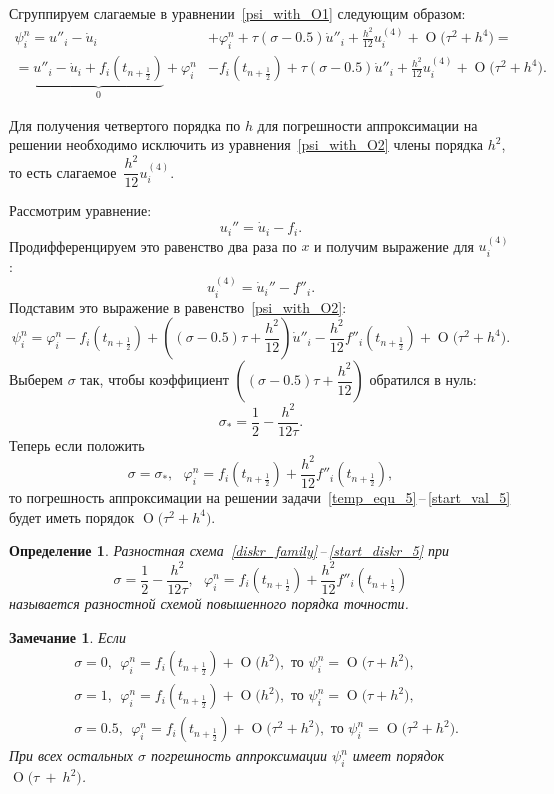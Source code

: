 \documentclass[11pt,a4paper,twoside]{report}
\numberwithin{equation}{section}
\newtheorem*{definition}{Определение}
\theoremstyle{definition}
\theoremstyle{plain}
\newtheorem*{note*}{Замечание}
\newcommand{\bigO}[1]{\ensuremath{\operatorname{O}\bigl(#1\bigr)}}
\begin{document}
Сгруппируем слагаемые в уравнении~\eqref{psi_with_O1} следующим образом:
%
\begin{equation}
%
    \label{psi_with_O2}
    \begin{split}
        \psi_i^n = u''_i - \dot{u}_i &+ \varphi_i^n + \tau(\sigma - 0.5)\dot{u}''_i
        +\frac{h^2}{12}u^{(4)}_i + \bigO{\tau^2 + h^4} = \\
        = \underbrace{u''_i - \dot{u}_i + f_i(t_{n+\frac12})}_0 + \varphi_i^n &-
        f_i(t_{n+\frac12}) + \tau(\sigma - 0.5)\dot{u}''_i +
        \frac{h^2}{12}u^{(4)}_i + \bigO{\tau^2 + h^4}.
    \end{split}
%
\end{equation}
%

Для получения четвертого порядка по $h$ для погрешности аппроксимации
на решении необходимо
исключить из уравнения~\eqref{psi_with_O2} члены порядка $h^2$, то есть
слагаемое~$\dfrac{h^2}{12}u_i^{(4)}$.

\noindent
Рассмотрим уравнение:
%
$$
    u_i'' = \dot{u}_i - f_i.
$$
%
Продифференцируем это равенство два раза по $x$ и получим выражение для $u_i^{(4)}$:
%
$$
    u_i^{(4)} = \dot{u}_i'' - f''_i.
$$
%
Подставим это выражение в равенство~\eqref{psi_with_O2}:
%
\begin{equation*}
%
    \psi_i^n = \varphi_i^n - f_i(t_{n+\frac12}) +
    \left((\sigma - 0.5)\tau + \frac{h^2}{12}\right) \dot{u}''_i -
    \frac{h^2}{12} f''_i(t_{n+\frac12}) + \bigO{\tau^2 + h^4}.
%
\end{equation*}
%
Выберем $\sigma$ так, чтобы коэффициент $\left((\sigma - 0.5)\tau + \dfrac{h^2}{12}\right)$
обратился в нуль:
%
$$
    \sigma_* = \dfrac12 - \dfrac{h^2}{12\tau}.
$$
%
Теперь если положить
%
$$
    \sigma = \sigma_*,
    ~~~\varphi_i^n = f_i(t_{n+\frac12}) + \frac{h^2}{12} f''_i(t_{n+\frac12}),
$$
%
то погрешность аппроксимации на решении задачи~\eqref{temp_equ_5}\,--\,\eqref{start_val_5}
будет иметь порядок $\bigO{\tau^2 + h^4}$.
%
\begin{definition}
%
    Разностная схема~\eqref{diskr_family}\,--\,\eqref{start_diskr_5} при
    $$
        \sigma = \frac12 - \frac{h^2}{12\tau},
        ~~~\varphi_i^n = f_i(t_{n+\frac12}) + \frac{h^2}{12} f''_i(t_{n+\frac12})
    $$
    называется разностной схемой повышенного порядка точности.
%
\end{definition}
%
\begin{note*}
%
Если
%
$$
    \begin{aligned}
    &\sigma = 0, ~~\varphi_i^n = f_i(t_{n+\frac12}) + \bigO{h^2}, \text{ то } \psi^n_i = \bigO{\tau + h^2}, \\
    &\sigma = 1, ~~\varphi_i^n = f_i(t_{n+\frac12}) + \bigO{h^2}, \text{ то } \psi^n_i = \bigO{\tau + h^2}, \\
    &\sigma = 0.5, ~~\varphi_i^n = f_i(t_{n+\frac12}) + \bigO{\tau^2 + h^2}, \text{ то } \psi^n_i =
    \bigO{\tau^2 + h^2}.
    \end{aligned}
$$
%
    При всех остальных $\sigma$ погрешность аппроксимации $\psi^n_i$ имеет
    порядок $\bigO{\tau~+~h^2}$.
%
\end{note*}
%
\end{document}
